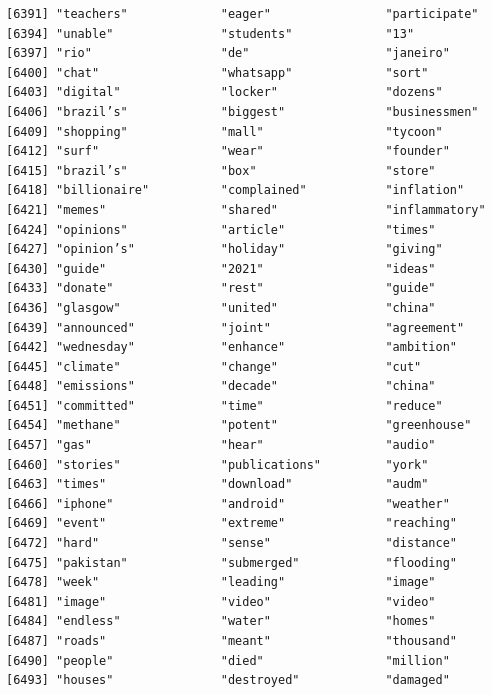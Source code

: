 \documentclass[
  letterpaper,
  DIV=11,
  numbers=noendperiod]{scrartcl}
\begin{document}
\begin{verbatim}
[6391] "teachers"             "eager"                "participate"         
[6394] "unable"               "students"             "13"                  
[6397] "rio"                  "de"                   "janeiro"             
[6400] "chat"                 "whatsapp"             "sort"                
[6403] "digital"              "locker"               "dozens"              
[6406] "brazil’s"             "biggest"              "businessmen"         
[6409] "shopping"             "mall"                 "tycoon"              
[6412] "surf"                 "wear"                 "founder"             
[6415] "brazil’s"             "box"                  "store"               
[6418] "billionaire"          "complained"           "inflation"           
[6421] "memes"                "shared"               "inflammatory"        
[6424] "opinions"             "article"              "times"               
[6427] "opinion’s"            "holiday"              "giving"              
[6430] "guide"                "2021"                 "ideas"               
[6433] "donate"               "rest"                 "guide"               
[6436] "glasgow"              "united"               "china"               
[6439] "announced"            "joint"                "agreement"           
[6442] "wednesday"            "enhance"              "ambition"            
[6445] "climate"              "change"               "cut"                 
[6448] "emissions"            "decade"               "china"               
[6451] "committed"            "time"                 "reduce"              
[6454] "methane"              "potent"               "greenhouse"          
[6457] "gas"                  "hear"                 "audio"               
[6460] "stories"              "publications"         "york"                
[6463] "times"                "download"             "audm"                
[6466] "iphone"               "android"              "weather"             
[6469] "event"                "extreme"              "reaching"            
[6472] "hard"                 "sense"                "distance"            
[6475] "pakistan"             "submerged"            "flooding"            
[6478] "week"                 "leading"              "image"               
[6481] "image"                "video"                "video"               
[6484] "endless"              "water"                "homes"               
[6487] "roads"                "meant"                "thousand"            
[6490] "people"               "died"                 "million"             
[6493] "houses"               "destroyed"            "damaged"             

\end{verbatim}
\end{document}
